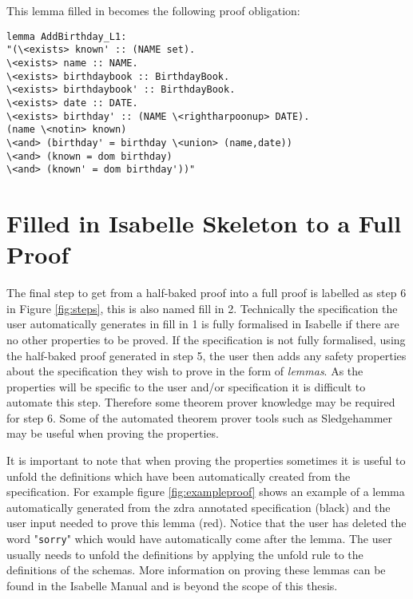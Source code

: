This lemma filled in becomes the following proof obligation:

\begin{verbatim}
lemma AddBirthday_L1:
"(\<exists> known' :: (NAME set).
\<exists> name :: NAME.
\<exists> birthdaybook :: BirthdayBook.
\<exists> birthdaybook' :: BirthdayBook.
\<exists> date :: DATE.
\<exists> birthday' :: (NAME \<rightharpoonup> DATE).
(name \<notin> known)
\<and> (birthday' = birthday \<union> (name,date))
\<and> (known = dom birthday)
\<and> (known' = dom birthday'))"
\end{verbatim}

\section{Filled in Isabelle Skeleton to a Full Proof}
\label{sec:isa2ful}

The final step to get from a half-baked proof into a full proof is labelled as step 6 in Figure \ref{fig:steps}, this is also named fill in 2. Technically the specification the user automatically generates in fill in 1 is fully formalised in Isabelle if there are no other properties to be proved. If the specification is not fully formalised, using the half-baked proof generated in step 5, the user then adds any safety properties about the specification they wish to prove in the form of \emph{lemmas}. As the properties will be specific to the user and/or specification it is difficult to automate this step. Therefore some theorem prover knowledge may be required for step 6. Some of the automated theorem prover tools such as Sledgehammer \cite{sledgehammer} may be useful when proving the properties.

It is important to note that when proving the properties sometimes it is useful to unfold the definitions which have been automatically created from the specification.
For example figure \ref{fig:exampleproof} shows an example of a lemma automatically generated from the \gls{zdra} annotated specification (black) and the user input needed to prove this lemma (red). Notice that the user has deleted the word "\texttt{sorry}" which would have automatically come after the lemma. The user usually needs to unfold the definitions by applying the unfold rule to the definitions of the schemas. More information on proving these lemmas can be found in the Isabelle Manual \cite{isabelle} and is beyond the scope of this thesis.

